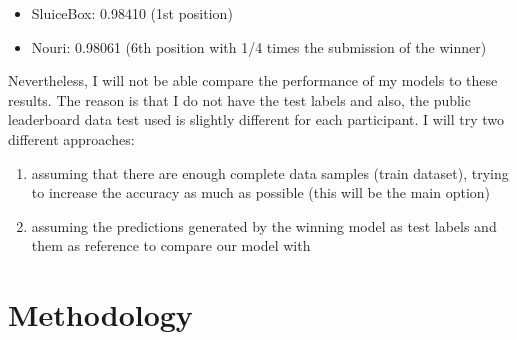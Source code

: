 \documentclass[]{article}
\begin{document}
\begin{itemize}
	\item SluiceBox: 0.98410 (1st position)
	\item Nouri: 0.98061 (6th position with 1/4 times the submission of the winner)
\end{itemize}

Nevertheless, I will not be able compare the performance of my models to these results. The reason is that I do not have the test labels and also, the public leaderboard data test used is slightly different for each participant. I will try two different approaches:

\begin{enumerate}
	\item assuming that there are enough complete data samples (train dataset), trying to increase the accuracy as much as possible (this will be the main option)
	\item assuming the predictions generated by the winning model as test labels and them as reference to compare our model with
\end{enumerate}

\section{Methodology}\label{iii.-methodology}
\end{document}
